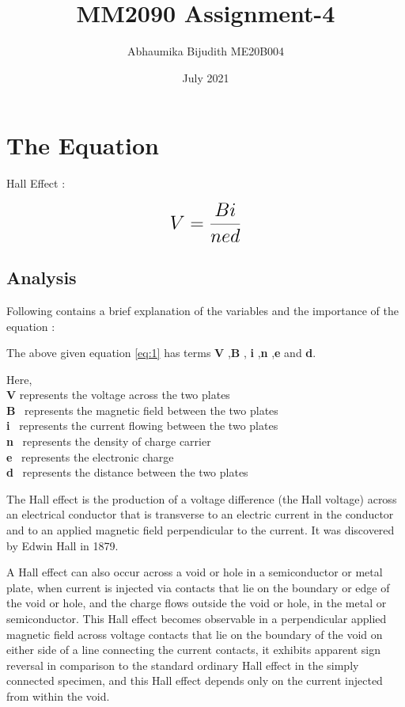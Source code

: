 \documentclass[a4paper, 13pt]{article}
\begin{document}
\title{MM2090 Assignment-4}
\author{Abhaumika Bijudith ME20B004}
\date{July 2021}
\maketitle

\section{The Equation}




Hall Effect  :  

\begin{equation}
 {\LARGE{\textbf{$V =\frac{Bi}{{ned}}$}}}
 \label{eqn:equation}
\end{equation}


\subsection{Analysis}
Following contains a brief explanation of the variables and the importance of the equation :
\begin{itemize}

    {\normalsize {The above given equation \ref{eq:1}  has terms \textbf{V} ,\textbf{B} , \textbf{i} ,\textbf{n} ,\textbf{e} and  \textbf{d}.}}

{\normalsize { Here,}}\\
{\normalsize {\textbf{V} represents the voltage across the two plates }}\\
{\normalsize {\textbf{B} \  represents the magnetic field between the two plates}}\\
{\normalsize {\textbf{i} \  represents the current flowing between the two plates}}\\
{\normalsize {\textbf{n} \  represents the density of charge carrier}}\\
{\normalsize{\textbf{e} \ represents the electronic charge}}\\
{\normalsize{\textbf{d} \ represents the distance between the two plates}}
\end{itemize}


The Hall effect is the production of a voltage difference (the Hall voltage) across an electrical conductor that is transverse to an electric current in the conductor and to an applied magnetic field perpendicular to the current. It was discovered by Edwin Hall in 1879.

A Hall effect can also occur across a void or hole in a semiconductor or metal plate, when current is injected via contacts that lie on the boundary or edge of the void or hole, and the charge flows outside the void or hole, in the metal or semiconductor. This Hall effect becomes observable in a perpendicular applied magnetic field across voltage contacts that lie on the boundary of the void on either side of a line connecting the current contacts, it exhibits apparent sign reversal in comparison to the standard ordinary Hall effect in the simply connected specimen, and this Hall effect depends only on the current injected from within the void.
\end{document}
